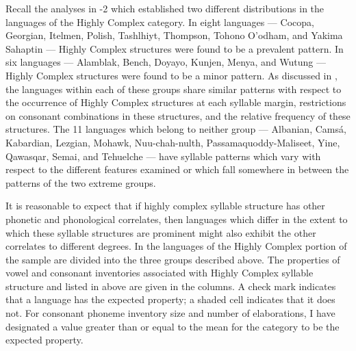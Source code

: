   Recall the analyses in -2 which established two different distributions in the languages of the Highly Complex category. In eight languages — Cocopa, Georgian, Itelmen, Polish, Tashlhiyt, Thompson, Tohono O’odham, and Yakima Sahaptin — Highly Complex structures were found to be a prevalent pattern. In six languages — Alamblak, Bench, Doyayo, Kunjen, Menya, and Wutung — Highly Complex structures were found to be a minor pattern. As discussed in , the languages within each of these groups share similar patterns with respect to the occurrence of Highly Complex structures at each syllable margin, restrictions on consonant combinations in these structures, and the relative frequency of these structures. The 11 languages which belong to neither group — Albanian, Camsá, Kabardian, Lezgian, Mohawk, Nuu-chah-nulth, Passamaquoddy-Maliseet, Yine, Qawasqar, Semai, and Tehuelche — have syllable patterns which vary with respect to the different features examined or which fall somewhere in between the patterns of the two extreme groups.

  It is reasonable to expect that if highly complex syllable structure has other phonetic and phonological correlates, then languages which differ in the extent to which these syllable structures are prominent might also exhibit the other correlates to different degrees. In  the languages of the Highly Complex portion of the sample are divided into the three groups described above. The properties of vowel and consonant inventories associated with Highly Complex syllable structure and listed in  above are given in the columns. A check mark indicates that a language has the expected property; a shaded cell indicates that it does not. For consonant phoneme inventory size and number of elaborations, I have designated a value greater than or equal to the mean for the category to be the expected property.

